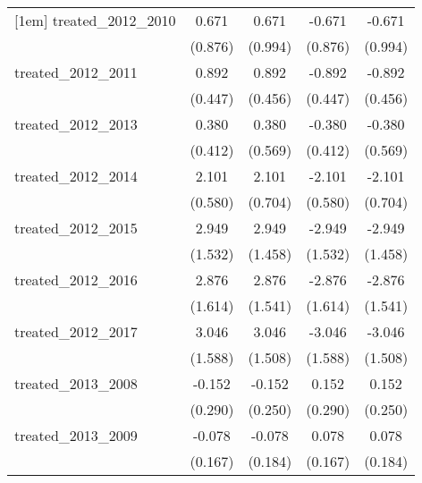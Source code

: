 {\begin{tabular}{l*{4}{c}}
[1em]
treated\_2012\_2010&       0.671         &       0.671         &      -0.671         &      -0.671         \\
            &     (0.876)         &     (0.994)         &     (0.876)         &     (0.994)         \\
[1em]
treated\_2012\_2011&       0.892\sym{*}  &       0.892         &      -0.892\sym{*}  &      -0.892         \\
            &     (0.447)         &     (0.456)         &     (0.447)         &     (0.456)         \\
[1em]
treated\_2012\_2013&       0.380         &       0.380         &      -0.380         &      -0.380         \\
            &     (0.412)         &     (0.569)         &     (0.412)         &     (0.569)         \\
[1em]
treated\_2012\_2014&       2.101\sym{***}&       2.101\sym{**} &      -2.101\sym{***}&      -2.101\sym{**} \\
            &     (0.580)         &     (0.704)         &     (0.580)         &     (0.704)         \\
[1em]
treated\_2012\_2015&       2.949         &       2.949\sym{*}  &      -2.949         &      -2.949\sym{*}  \\
            &     (1.532)         &     (1.458)         &     (1.532)         &     (1.458)         \\
[1em]
treated\_2012\_2016&       2.876         &       2.876         &      -2.876         &      -2.876         \\
            &     (1.614)         &     (1.541)         &     (1.614)         &     (1.541)         \\
[1em]
treated\_2012\_2017&       3.046         &       3.046\sym{*}  &      -3.046         &      -3.046\sym{*}  \\
            &     (1.588)         &     (1.508)         &     (1.588)         &     (1.508)         \\
[1em]
treated\_2013\_2008&      -0.152         &      -0.152         &       0.152         &       0.152         \\
            &     (0.290)         &     (0.250)         &     (0.290)         &     (0.250)         \\
[1em]
treated\_2013\_2009&      -0.078         &      -0.078         &       0.078         &       0.078         \\
            &     (0.167)         &     (0.184)         &     (0.167)         &     (0.184)         \\

\end{tabular}}
